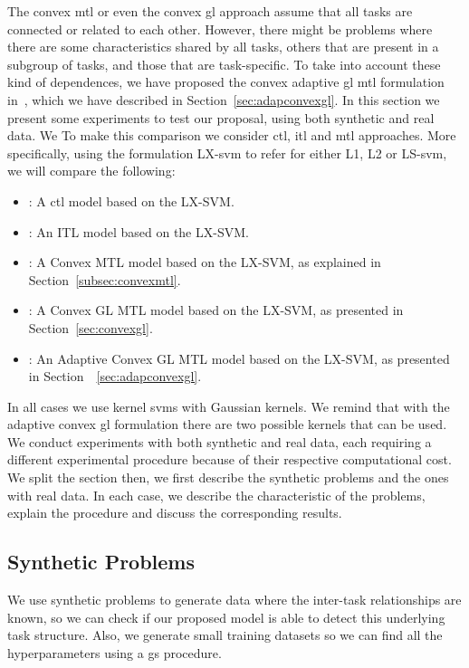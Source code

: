 The convex \acrshort{mtl} or even the convex \acrshort{gl} approach assume that all tasks are connected or related to each other. However, there might be problems where there are some characteristics shared by all tasks, others that are present in a subgroup of tasks, and those that are task-specific.
%
To take into account these kind of dependences, we have proposed the convex adaptive \acrshort{gl} \acrshort{mtl} formulation in~\cite{RuizAD21_hais}, which we have described in Section~\ref{sec:adapconvexgl}.
%
In this section we present some experiments to test our proposal, using both synthetic and real data. 
%
We 
To make this comparison we consider \acrshort{ctl}, \acrshort{itl} and \acrshort{mtl} approaches. More specifically, using the formulation LX-\acrshort{svm} to refer for either L1, L2 or LS-\acrshort{svm}, we will compare the following:
\begin{itemize}
    \item {}: A \acrshort{ctl} model based on the LX-SVM.
    \item {}: An ITL model based on the LX-SVM.
    \item {}: A Convex MTL model based on the LX-SVM, as explained in Section~\ref{subsec:convexmtl}.
    \item {}: A Convex GL MTL model based on the LX-SVM, as presented in Section~\ref{sec:convexgl}.
    \item {}: An Adaptive Convex GL MTL model based on the LX-SVM, as presented in Section~~\ref{sec:adapconvexgl}.
\end{itemize}
In all cases we use kernel \acrshort{svms} with Gaussian kernels. We remind that with the adaptive convex \acrshort{gl} formulation there are two possible kernels that can be used.
%
We conduct experiments with both synthetic and real data, each requiring a different experimental procedure because of their respective computational cost. We split the section then, we first describe the synthetic problems and the ones with real data. In each case, we describe the characteristic of the problems, explain the procedure and discuss the corresponding results. 



\subsection{Synthetic Problems}
%
We use synthetic problems to generate data where the inter-task relationships are known, so we can check if our proposed model is able to detect this underlying task structure.
%
Also, we generate small training datasets so we can find all the hyperparameters using a \acrshort{gs} procedure.

